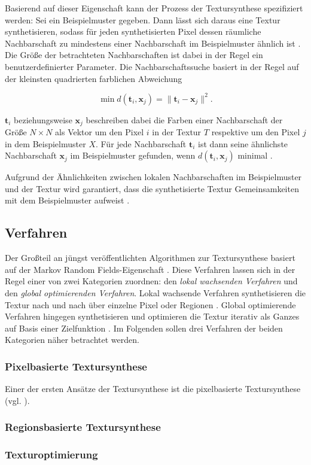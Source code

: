 Basierend auf dieser Eigenschaft kann der Prozess der Textursynthese spezifiziert werden:
Sei ein Beispielmuster gegeben.
Dann lässt sich daraus eine Textur synthetisieren, sodass für jeden synthetisierten Pixel dessen räumliche Nachbarschaft zu mindestens einer Nachbarschaft im Beispielmuster ähnlich ist \cite{StateOfTheArt}.
Die Größe der betrachteten Nachbarschaften ist dabei in der Regel ein benutzerdefinierter Parameter.
Die Nachbarschaftssuche basiert in der Regel auf der kleinsten quadrierten farblichen Abweichung 

\begin{equation}
	\min d(\textbf{t}_i, \textbf{x}_j) = \lVert \textbf{t}_i - \textbf{x}_j \rVert^2\text{.}
\end{equation}

$\textbf{t}_i$ beziehungsweise $\textbf{x}_j$ beschreiben dabei die Farben einer Nachbarschaft der Größe $N \times N$ als Vektor um den Pixel $i$ in der Textur $T$ respektive um den Pixel $j$ in dem Beispielmuster $X$.
Für jede Nachbarschaft $\textbf{t}_i$ ist dann seine ähnlichste Nachbarschaft $\textbf{x}_j$ im Beispielmuster gefunden, wenn $d(\textbf{t}_i, \textbf{x}_j)$ minimal \cite{TexturOptimization}.

Aufgrund der Ähnlichkeiten zwischen lokalen Nachbarschaften im Beispielmuster und der Textur wird garantiert, dass die synthetisierte Textur Gemeinsamkeiten mit dem Beispielmuster aufweist \cite{StateOfTheArt}.

\subsection{Verfahren}

Der Großteil an jüngst veröffentlichten Algorithmen zur Textursynthese basiert auf der \glqq Markov Random Fields\grqq -Eigenschaft \cite{StateOfTheArt}.
Diese Verfahren lassen sich in der Regel einer von zwei Kategorien zuordnen: den \emph{lokal wachsenden Verfahren} und den \emph{global optimierenden Verfahren}.
Lokal wachsende Verfahren synthetisieren die Textur nach und nach über einzelne Pixel oder Regionen \cite{TexturOptimization}.
Global optimierende Verfahren hingegen synthetisieren und optimieren die Textur iterativ als Ganzes auf Basis einer Zielfunktion \cite{SelfTuning}.
Im Folgenden sollen drei Verfahren der beiden Kategorien näher betrachtet werden.

\subsubsection{Pixelbasierte Textursynthese}

Einer der ersten Ansätze der Textursynthese ist die pixelbasierte Textursynthese (vgl. \cite{EL99}).


\subsubsection{Regionsbasierte Textursynthese}

\subsubsection{Texturoptimierung}